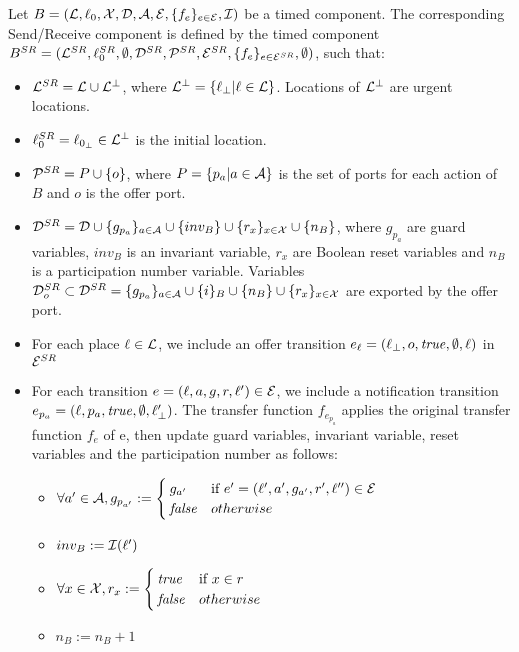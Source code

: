 \begin{definition}\label{def:tc_SR}
  Let $B=(\mathcal{L},\ell_{0},\mathcal{X},\mathcal{D},\mathcal{A},\mathcal{E},\{f_e\}_{e\in\mathcal{E}},\mathcal{I})$ be a timed component. The 
  corresponding Send/Receive component is defined by the timed component
  $B^{SR}=(\mathcal{L}^{SR},\ell_0^{SR},\emptyset,\mathcal{D}^{SR},\mathcal{P}^{SR},\mathcal{E}^{SR},\{f_e\}_{e\in\mathcal{E}^{SR}},
  \emptyset)$, such that:
  \begin{itemize}
    \item $\mathcal{L}^{SR}=\mathcal{L}\cup\mathcal{L}^{\perp}$, where $\mathcal{L}^{\perp}=\{\ell_{\perp}|\ell\in\mathcal{L}\}$.
      Locations of $\mathcal{L}^{\perp}$ are urgent locations.
    \item $\ell_0^{SR}=\ell_{0_{\perp}}\in\mathcal{L}^{\perp}$ is the initial location.
    \item $\mathcal{P}^{SR}= P\cup\{o\}$, where $P=\{p_a|a\in\mathcal{A}\}$ is the set of ports for each
      action of $B$ and $o$ is the offer port. 
    \item $\mathcal{D}^{SR}=\mathcal{D}\cup\{g_{p_a}\}_{a\in\mathcal{A}}\cup\{inv_B\}\cup\{r_x\}_{x\in\mathcal{X}}
      \cup\{n_B\}$,
      where $g_{p_a}$ are guard variables, $inv_{B}$ is an invariant variable, $r_x$ are 
      Boolean reset variables and $n_B$ is a participation number variable.
      Variables $\mathcal{D}_o^{SR}\subset\mathcal{D}^{SR}=\{g_{p_a}\}_{a\in\mathcal{A}}\cup\{i\}_{B}\cup
      \{n_B\}\cup\{r_x\}_{x\in\mathcal{X}}$  are exported by the offer port.
    \item For each place $\ell\in\mathcal{L}$, we include an offer transition $e_{\ell}=(\ell_{\perp},o,\textnormal{\textit{true}},
      \emptyset,\ell)$ in $\mathcal{E}^{SR}$
    \item For each transition $e=(\ell,a,g,r,\ell')\in\mathcal{E}$, we include a notification 
      transition $e_{p_a}=(\ell,p_a,\textnormal{\textit{true}},\emptyset,\ell_{\perp}')$. The transfer function $f_{e_{p_a}}$
      applies the original transfer function $f_e$ of e, then update guard variables, 
      invariant variable, reset variables and the participation number as follows:
      \begin{itemize}
        \item $\forall a'\in\mathcal{A}, g_{p_{a'}}:=\begin{cases}
            g_{a'} & \text{if } e'=(\ell',a',g_{a'},r',\ell'')\in\mathcal{E}\\
          \textnormal{\textit{false}} & otherwise
        \end{cases}$
        \item $inv_B:=\mathcal{I}(\ell')$
        \item $\forall x\in\mathcal{X}, r_x:=\begin{cases}
            \textnormal{\textit{true}} & \text{if } x\in r\\
          \textnormal{\textit{false}} & otherwise
        \end{cases}$
        \item $n_B:=n_B+1$
      \end{itemize}
  \end{itemize}
\end{definition}

